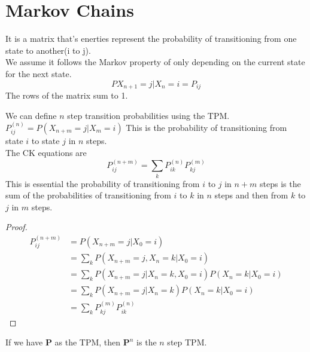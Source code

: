 \documentclass[answers,12pt,addpoints]{exam}
\begin{document}
\section*{Markov Chains}
\begin{definition}
    It is a matrix that's enerties represent the probability of transitioning from one state to another(i to j).\\
    We assume it follows the Markov property of only depending on the current state for the next state.\\
    $$P{X_{n+1} = j| X_n = i} = P_{ij}$$
    The rows of the matrix sum to 1.
\end{definition}
\begin{definition}
    We can define $n$ step transition probabilities using the TPM.\\
    $P_{ij}^{(n)} = P(X_{n+m} = j | X_m = i)$
    This is the probability of transitioning from state $i$ to state $j$ in $n$ steps.\\
    The CK equations are
    $$ P_{ij}^{(n+m)} = \sum_{k} P_{ik}^{(n)}P_{kj}^{(m)}$$
    This is essential the probability of transitioning from $i$ to $j$ in $n+m$ steps is the sum of the probabilities of transitioning from $i$ to $k$ in $n$ steps and then from $k$ to $j$ in $m$ steps.
    \begin{proof}
        \begin{align*}
            P_{ij}^{(n+m)} &= P(X_{n+m} = j | X_0 = i)\\
            &= \sum_{k} P(X_{n+m} = j, X_n = k | X_0 = i)\\
            &= \sum_{k} P(X_{n+m} = j | X_n = k, X_0 = i)P(X_n = k | X_0 = i)\\
            &= \sum_{k} P(X_{n+m} = j | X_n = k)P(X_n = k | X_0 = i)\\
            &= \sum_{k} P_{kj}^{(m)}P_{ik}^{(n)}
        \end{align*}
    \end{proof}
    If we have $\mathbf{P}$ as the TPM, then $\mathbf{P}^n$ is the $n$ step TPM.
\end{definition}
\end{document}

